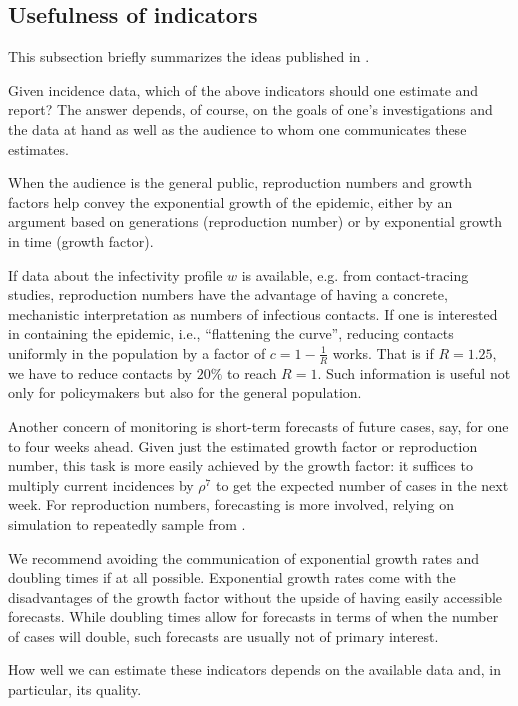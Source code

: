 \subsection{Usefulness of indicators}
\label{subsec:usefulness_of_indicators}
This subsection briefly summarizes the ideas published in \citep{Heyder2023Measures}.

Given incidence data, which of the above indicators should one estimate and report? The answer depends, of course, on the goals of one's investigations and the data at hand as well as the audience to whom one communicates these estimates. 

When the audience is the general public, reproduction numbers and growth factors help convey the exponential growth of the epidemic, either by an argument based on generations (reproduction number) or by exponential growth in time (growth factor).

If data about the infectivity profile $w$ is available, e.g. from contact-tracing studies, reproduction numbers have the advantage of having a concrete, mechanistic interpretation as numbers of infectious contacts. If one is interested in containing the epidemic, i.e., ``{}flattening the curve''{}, reducing contacts uniformly in the population by a factor of $c = 1 - \frac{1}{R}$ works. That is if $R = 1.25$, we have to reduce contacts by $20\%$ to reach $R = 1$. Such information is useful not only for policymakers but also for the general population. 

Another concern of monitoring is short-term forecasts of future cases, say, for one to four weeks ahead. Given just the estimated growth factor or reproduction number, this task is more easily achieved by the growth factor: it suffices to multiply current incidences by $\rho^{7}$ to get the expected number of cases in the next week. For reproduction numbers, forecasting is more involved, relying on simulation to repeatedly sample from .

We recommend avoiding the communication of exponential growth rates and doubling times if at all possible. Exponential growth rates come with the disadvantages of the growth factor without the upside of having easily accessible forecasts. While doubling times allow for forecasts in terms of when the number of cases will double, such forecasts are usually not of primary interest. 

How well we can estimate these indicators depends on the available data and, in particular, its quality.